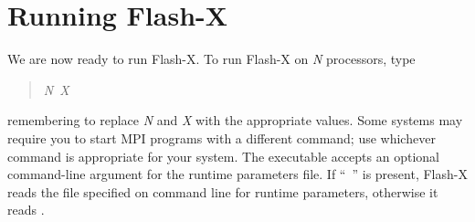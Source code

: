 \section{Running Flash-X}

We are now ready to run Flash-X. To run Flash-X on \emph{N} processors,
type 
\begin{quote} 
\emph{N\/}~\emph{X}
\end{quote}

\noindent remembering to replace \emph{N} and \emph{X} with the
appropriate values. Some systems may require you to start MPI programs
with a different command; use whichever command is appropriate for
your system. The \flashx executable accepts an optional command-line
argument for the runtime parameters file. If 
``~''
is present, Flash-X reads the file specified on command 
line for runtime parameters, otherwise it reads .  


\begin{comment}
, and the name of
checkpoint file (\code{-chk\_file}
\latexhtml{$<$}{&lt;}filename\latexhtml{$>$}{&gt;}).
\end{comment}

\begin{comment}
If the \code{-chk\_file} is found, Flash-X assumes that it is starting from
restart, and it gets the runtime parameters from the file specified on
the command line. In this situation \emph{flash.par} is ignored. If
both the arguments are present, the \code{\-par\_file} argument is
ignored and runtime parameters are read from the checkpoint file
specified on command line.
\end{comment}

